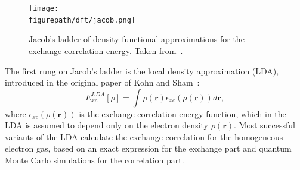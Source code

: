 \begin{refsection}
\begin{figure}[ht]
\centering 
\texttt{[image: \\figurepath/dft/jacob.png]} 
\caption{Jacob's ladder of density functional approximations for the 
exchange-correlation energy. Taken from~\cite{Wang2014}.} 
\label{dft:fig-jacob} 
\end{figure} 
 
The first rung on Jacob's ladder is the local density approximation 
(\gls{LDA}), introduced in the original paper of Kohn and Sham~\cite{Kohn1965}: 
\begin{equation} 
E_{xc}^{LDA}[\rho] = \int \rho(\mathbf{r}) 
\epsilon_{xc}(\rho(\mathbf{r}))d\mathbf{r}, 
\end{equation} 
where $\epsilon_{xc}(\rho(\mathbf{r}))$ is the exchange-correlation energy 
function, which in the \gls{LDA} is assumed to depend only on the electron density 
$\rho(\mathbf{r})$. Most successful variants of the \gls{LDA} calculate the 
exchange-correlation for the homogeneous electron gas, based on an exact 
expression for the exchange part and quantum Monte Carlo simulations for the 
correlation part. 
 

\end{refsection}
